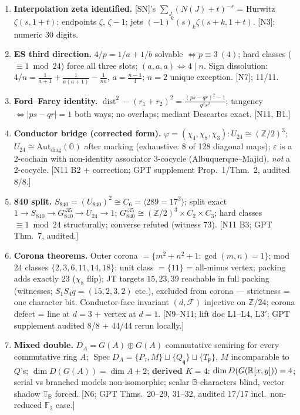 \documentclass[10pt]{article}
\newcommand{\B}{\mathbb B}\newcommand{\N}{\mathbb N}\newcommand{\Z}{\mathbb Z}
\newcommand{\Ooct}{\mathbb O}
\begin{document}
\begin{enumerate}[leftmargin=1.6em,itemsep=1pt]
\item \textbf{Interpolation zeta identified.} [SN]'s $\sum_J(N(J)+t)^{-s}$ = Hurwitz $\zeta(s,1+t)$; endpoints $\zeta$, $\zeta-1$; jets $(-1)^k(s)_k\zeta(s+k,1+t)$. [N3]; numeric 30 digits.
\item \textbf{ES third direction.} $4/p=1/a+1/b$ solvable $\iff p\equiv3\ (4)$; hard classes ($\equiv1\bmod24$) force all three slots; $(a,a,a)\iff4\mid n$. Sign dissolution: $4/n=\frac1{a+1}+\frac1{a(a+1)}-\frac1{na}$, $a=\frac{n-1}4$; $n=2$ unique exception. [N7]; 11/11.
\item \textbf{Ford--Farey identity.} $\operatorname{dist}^2-(r_1+r_2)^2=\frac{(ps-qr)^2-1}{q^2s^2}$; tangency $\iff|ps-qr|=1$ both ways; no overlaps; mediant Descartes exact. [N11, B1.]
\item \textbf{Conductor bridge (corrected form).} $\varphi=(\chi_4,\chi_8,\chi_3):U_{24}\cong(\Z/2)^3$; $U_{24}\cong\operatorname{Aut_{diag}}(\Ooct)$ after marking (exhaustive: 8 of 128 diagonal maps); $\varepsilon$ is a 2-cochain with non-identity associator 3-cocycle (Albuquerque--Majid), \emph{not} a 2-cocycle. [N11 B2 + correction; GPT supplement Prop.\ 1/Thm.\ 2, audited 8/8.]
\item \textbf{840 split.} $S_{840}=(U_{840})^2\cong C_6=\langle289=17^2\rangle$; split exact $1\to S_{840}\to G^{\square35}_{840}\to U_{24}\to1$; $G^{\square35}_{840}\cong(\Z/2)^3\times C_2\times C_3$; hard classes $\equiv1\bmod24$ structurally; converse refuted (witness 73). [N11 B3; GPT Thm.\ 7, audited.]
\item \textbf{Corona theorems.} Outer corona $=\{m^2+n^2+1:\gcd(m,n)=1\}$; mod 24 classes $\{2,3,6,11,14,18\}$; unit class $=\{11\}$ = all-minus vertex; packing adds exactly $23$ ($\chi_8$ flip); JT targets $15,23,39$ reachable in full packing (witnesses; $S_1S_4q=(15,2,3,2)$ etc.), excluded from corona --- strictness = one character bit. Conductor-face invariant $(d,\mathcal F)$ injective on $\Z/24$; corona defect = line at $d{=}3$ + vertex at $d{=}1$. [N9--N11; lift doc L1--L4, L3$'$; GPT supplement audited 8/8 + 44/44 rerun locally.]
\item \textbf{Mixed double.} $D_A=G(A)\oplus G(A)$ commutative semiring for every commutative ring $A$; $\operatorname{Spec}D_A=\{P_\tau,M\}\sqcup\{Q_{\mathfrak q}\}\sqcup\{T_{\mathfrak p}\}$, $M$ incomparable to $Q$'s; $\dim D(G(A))=\dim A+2$; \textbf{derived $K{=}4$}: $\dim D(G(\mathbb R[x,y]))=4$; serial vs branched models non-isomorphic; scalar $\B$-characters blind, vector shadow $\mathbb T_\B$ forced. [N6; GPT Thms.\ 20--29, 31--32, audited 17/17 incl.\ non-reduced $\mathbb F_2$ case.]

\end{enumerate}
\end{document}

